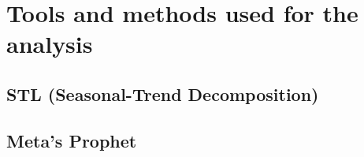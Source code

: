 \section{Tools and methods used for the analysis}
\noindent


\vspace{-15pt}

\subsection{STL (Seasonal-Trend Decomposition)}

\subsection{Meta's Prophet}

